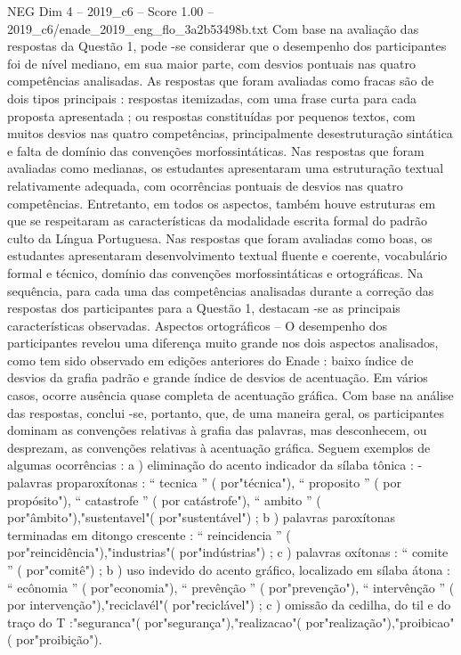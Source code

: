 \begin{textsample}{NEG Dim 4 – 2019\_c6 – Score 1.00 – 2019\_c6/enade\_2019\_eng\_flo\_3a2b53498b.txt}
Com base na avaliação das respostas da Questão 1, pode -se considerar que o desempenho dos participantes foi de nível mediano, em sua maior parte, com desvios pontuais nas quatro competências analisadas.
As respostas que foram avaliadas como fracas são de dois tipos principais : respostas itemizadas, com uma frase curta para cada proposta apresentada ; ou respostas constituídas por pequenos textos, com muitos desvios nas quatro competências, principalmente desestruturação sintática e falta de domínio das convenções morfossintáticas.
Nas respostas que foram avaliadas como medianas, os estudantes apresentaram uma estruturação textual relativamente adequada, com ocorrências pontuais de desvios nas quatro competências.
Entretanto, em todos os aspectos, também houve estruturas em que se respeitaram as características da modalidade escrita formal do padrão culto da Língua Portuguesa.
Nas respostas que foram avaliadas como boas, os estudantes apresentaram desenvolvimento textual fluente e coerente, vocabulário formal e técnico, domínio das convenções morfossintáticas e ortográficas.
Na sequência, para cada uma das competências analisadas durante a correção das respostas dos participantes para a Questão 1, destacam -se as principais características observadas.
Aspectos ortográficos – O desempenho dos participantes revelou uma diferença muito grande nos dois aspectos analisados, como tem sido observado em edições anteriores do Enade : baixo índice de desvios da grafia padrão e grande índice de desvios de acentuação.
Em vários casos, ocorre ausência quase completa de acentuação gráfica.
Com base na análise das respostas, conclui -se, portanto, que, de uma maneira geral, os participantes dominam as convenções relativas à grafia das palavras, mas desconhecem, ou desprezam, as convenções relativas à acentuação gráfica.
Seguem exemplos de algumas ocorrências : a ) eliminação do acento indicador da sílaba tônica : - palavras proparoxítonas : “ tecnica ” ( por"técnica"), “ proposito ” ( por propósito"), “ catastrofe ” ( por catástrofe"), “ ambito ” ( por"âmbito"),"sustentavel"( por"sustentável") ; b ) palavras paroxítonas terminadas em ditongo crescente : “ reincidencia ” ( por"reincidência"),"industrias"( por"indústrias") ; c ) palavras oxítonas : “ comite ” ( por"comitê") ; b ) uso indevido do acento gráfico, localizado em sílaba átona : “ ecônomia ” ( por"economia"), “ prevênção ” ( por"prevenção"), “ intervênção ” ( por intervenção"),"reciclavél"( por"reciclável") ; c ) omissão da cedilha, do til e do traço do T :"seguranca"( por"segurança"),"realizacao"( por"realização"),"proibicao"( por"proibição").

\end{textsample}
